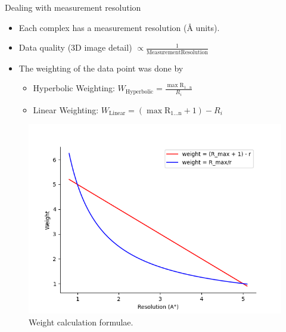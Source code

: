 \documentclass{beamer}
\begin{document}
\begin{frame}[t]{Dealing with measurement resolution}
\begin{itemize}
\item Each complex has a measurement resolution (\si{\angstrom} units).
\item Data quality (3D image detail) $\propto \frac{1}{\mathrm{Measurement
Resolution}}$
\item The weighting of the data point was done by
\begin{itemize}
\item Hyperbolic Weighting: $ W_\mathrm{Hyperbolic} = \frac{ \mathrm{\max{R_{1 ...  n}}}}{R_i}$
\item Linear Weighting: $W_\mathrm{Linear}  = (\mathrm{\max{R_{1 ...  n}}} + 1) - R_i$
\end{itemize} 
\end{itemize}

\begin{figure}
     \centering
         \centering
    \includegraphics[scale=0.30]{images/graphingformula}
    \caption{Weight calculation formulae.}
    \label{fig:graphingformula}
\end{figure}

\end{frame}
\end{document}
